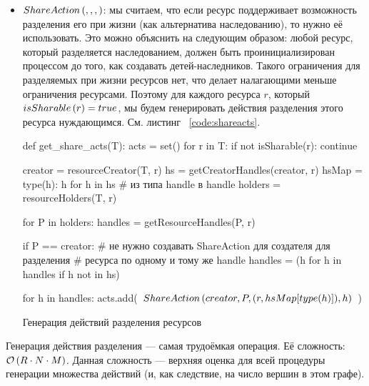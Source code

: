 \begin{itemize}
	\item $ShareAction\left( , , ,  \right)$: мы считаем, что если ресурс поддерживает возможность разделения его при жизни (как альтернатива наследованию), то нужно её использовать. Это можно объяснить на следующим образом: любой ресурс, который разделяется наследованием, должен быть проинициализирован процессом до того, как создавать детей-наследников. Такого ограничения для разделяемых при жизни ресурсов нет, что делает налагающими меньше ограничения ресурсами. Поэтому для каждого ресурса $r$, который $isSharable\left( r \right) = true$, мы будем генерировать действия разделения этого ресурса нуждающимся. См. листинг ~\ref{code:shareacts}.

\begin{listing}[ht!]
\begin{pythoncode}
def get_share_acts(T):
    acts = set()
    for r in T:
        if not isSharable(r):
            continue

        creator = resourceCreator(T, r)
        hs = getCreatorHandles(creator, r)
        hsMap = {type(h): h for h in hs}  # из типа handle в handle
        holders = resourceHolders(T, r)

        for P in holders:
            handles = getResourceHandles(P, r)

            if P == creator:
                # не нужно создавать ShareAction для создателя для разделения
                # ресурса по одному и тому же handle
                handles = (h for h in handles if h not in hs)
            
            for h in handles:
                 acts.add(~$\crshare{creator}{P}{(r, hsMap[type(h)])}{h}$~)
\end{pythoncode}
\caption{Генерация действий разделения ресурсов}
\label{code:shareacts}
\end{listing}

\end{itemize}

Генерация действия разделения --- самая трудоёмкая операция. Её сложность: $\mathcal{O}\left(R \cdot N \cdot M\right)$. Данная сложность --- верхняя оценка для всей процедуры генерации множества действий (и, как следствие, на число вершин в этом графе).

